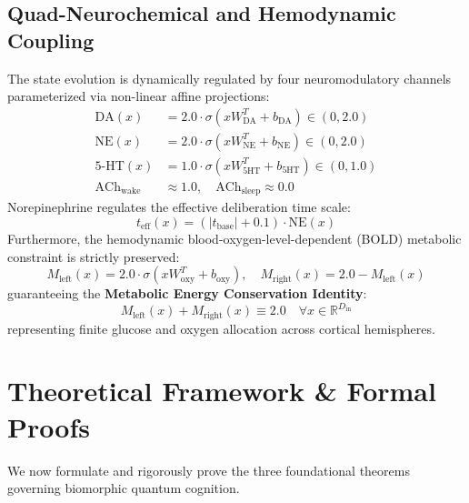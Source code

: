 \documentclass[10pt,twocolumn,3p]{article}
\begin{document}
\subsection{Quad-Neurochemical and Hemodynamic Coupling}
\label{subsec:neurochemistry}

The state evolution is dynamically regulated by four neuromodulatory channels parameterized via non-linear affine projections:
\begin{align}
    \text{DA}(x) &= 2.0 \cdot \sigma\left( x W_{\text{DA}}^T + b_{\text{DA}} \right) \in (0, 2.0) \\
    \text{NE}(x) &= 2.0 \cdot \sigma\left( x W_{\text{NE}}^T + b_{\text{NE}} \right) \in (0, 2.0) \\
    \text{5-HT}(x) &= 1.0 \cdot \sigma\left( x W_{\text{5HT}}^T + b_{\text{5HT}} \right) \in (0, 1.0) \\
    \text{ACh}_{\text{wake}} &\approx 1.0, \quad \text{ACh}_{\text{sleep}} \approx 0.0
\end{align}
Norepinephrine regulates the effective deliberation time scale:
\begin{equation}
    t_{\text{eff}}(x) = \left( |t_{\text{base}}| + 0.1 \right) \cdot \text{NE}(x)
\end{equation}
Furthermore, the hemodynamic blood-oxygen-level-dependent (BOLD) metabolic constraint is strictly preserved:
\begin{equation}
    M_{\text{left}}(x) = 2.0 \cdot \sigma\left( x W_{\text{oxy}}^T + b_{\text{oxy}} \right), \quad M_{\text{right}}(x) = 2.0 - M_{\text{left}}(x)
\end{equation}
guaranteeing the \textbf{Metabolic Energy Conservation Identity}:
\begin{equation}
    \boxed{M_{\text{left}}(x) + M_{\text{right}}(x) \equiv 2.0 \quad \forall x \in \mathbb{R}^{D_{\text{in}}}}
    \label{eq:metabolic_conservation}
\end{equation}
representing finite glucose and oxygen allocation across cortical hemispheres.

\section{Theoretical Framework \& Formal Proofs}
\label{sec:theorems}

We now formulate and rigorously prove the three foundational theorems governing biomorphic quantum cognition.
\end{document}
